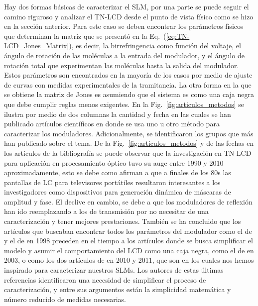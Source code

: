 Hay dos formas básicas de caracterizar el
SLM, por una parte se puede seguir el camino riguroso y analizar el
TN-LCD desde el punto de vista físico como se hizo en la sección
anterior. Para este caso se deben encontrar los parámetros físicos que
determinan la matriz que se presentó en la Eq.~(\ref{eq:TN-LCD_Jones_Matrix}), es decir, la 
birrefringencia como función del voltaje, el ángulo de rotación de las
moléculas a la entrada del modulador, y el ángulo de rotación total
que experimentan las moléculas hasta la salida del modulador. Estos
parámetros son encontrados en la mayoría de los casos por medio de
ajuste de curvas con medidas experimentales de la tramitancia.  La
otra forma en la que se obtiene la matriz de Jones es asumiendo que el
sistema es como una caja negra que debe cumplir reglas menos
exigentes. En la Fig.~\ref{fig:articulos_metodos} se ilustra por
medio de dos columnas la cantidad y fecha en las cuales se han
publicado artículos científicos en donde se usa uno u otro método
para caracterizar los moduladores. Adicionalmente, se identificaron los
grupos que más han publicado sobre el tema. De la Fig.~\ref{fig:articulos_metodos} y de las fechas en los artículos de la
bibliografía se puede observar que la investigación en TN-LCD para
aplicación en procesamiento óptico tuvo su auge entre 1990 y 2010
aproximadamente, esto se debe como afirman 
a que a finales de los 80s las pantallas 
de LC para televisores portátiles resultaron interesantes a los
investigadores como dispositivos para generación dinámica de máscaras
de amplitud y fase. El declive en cambio, se debe a que los
moduladores de reflexión han ido reemplazando a los de transmisión por
 no necesitar de una caracterización y tener mejores prestaciones. 
También se ha concluido que los artículos que buscaban encontrar todos los
parámetros del modulador como el de  y
el de  en 1998 preceden en el tiempo a los artículos
donde se busca simplificar el modelo y asumir el comportamiento del
LCD como una caja negra, como el de  en 2003, o
como los dos artículos de  en 2010 y
2011, que son en los cuales nos
hemos inspirado para caracterizar nuestros SLMs. Los autores de estas
últimas referencias identificaron una necesidad de 
simplificar el proceso de caracterización, y entre sus argumentos 
están la simplicidad matemática y número reducido de medidas necesarias.
